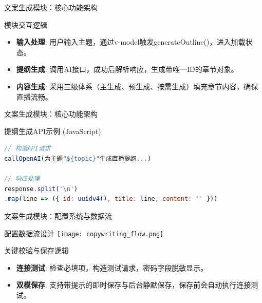 \documentclass{beamer}
\begin{document}
\begin{frame}[fragile]{文案生成模块：核心功能架构}
\begin{block}{模块交互逻辑}
\begin{itemize}
\item \textbf{输入处理}: 用户输入主题，通过v-model触发generateOutline()，进入加载状态。
\item \textbf{提纲生成}: 调用AI接口，成功后解析响应，生成带唯一ID的章节对象。
\item \textbf{内容生成}: 采用三级体系（主生成、预生成、按需生成）填充章节内容，确保直播流畅。
\end{itemize}
\end{block}
\end{frame}


\begin{frame}[fragile]{文案生成模块：核心功能架构}
\begin{block}{提纲生成API示例 (JavaScript)}
\begin{lstlisting}[language=JavaScript]
// 构造API请求
callOpenAI(为主题"${topic}"生成直播提纲...)

// 响应处理
response.split('\n')
.map(line => ({ id: uuidv4(), title: line, content: '' }))
\end{lstlisting}
\end{block}
\end{frame}

\begin{frame}{文案生成模块：配置系统与数据流}
\begin{block}{配置数据流设计}
\centering
\texttt{[image: copywriting\_flow.png]}
\end{block}
\begin{exampleblock}{关键校验与保存逻辑}
\begin{itemize}
\item \textbf{连接测试}: 检查必填项，构造测试请求，密码字段脱敏显示。
\item \textbf{双模保存}: 支持带提示的即时保存与后台静默保存，保存前会自动执行连接测试。
\end{itemize}
\end{exampleblock}
\end{frame}
\end{document}
